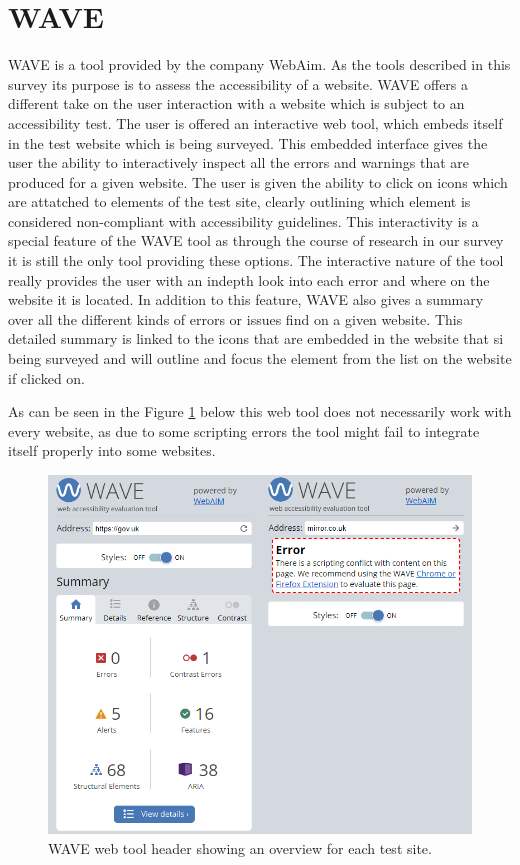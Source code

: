 \newpage 

\section{WAVE}

WAVE \parencite{WAVE_web} is a tool provided by the company WebAim. As the tools described in this survey its purpose is to assess the accessibility of a website. WAVE offers a different take on the user interaction with a website which is subject to an accessibility test. The user is offered an interactive web tool, which embeds itself in the test website which is being surveyed. 
This embedded interface gives the user the ability to interactively inspect all the errors and warnings that are produced for a given website. The user is given the ability to click on icons which are attatched to elements of the test site, clearly outlining which element is considered non-compliant with accessibility guidelines. This interactivity is a special feature of the WAVE tool as through the course of research in our survey it is still the only tool providing these options. The interactive nature of the tool really provides the user with an indepth look into each error and where on the website it is located. In addition to this feature, WAVE also gives a summary over all the different kinds of errors or issues find on a given website. This detailed summary is linked to the icons that are embedded in the website that si being surveyed and will outline and focus the element from the list on the website if clicked on. 

As can be seen in the Figure \ref{fig:WAVE} below this web tool does not necessarily work with every website, as due to some scripting errors the tool might fail to integrate itself properly into some websites.


\begin{figure}[h!]
    \centering
    \includegraphics[keepaspectratio,width=\linewidth,height=\halfh]
    {images/WAVE.png}
    
    \caption[Accessi Overview]
    {%
    WAVE web tool header showing an overview for each test site.
    }
    \label{fig:WAVE}
\end{figure}

